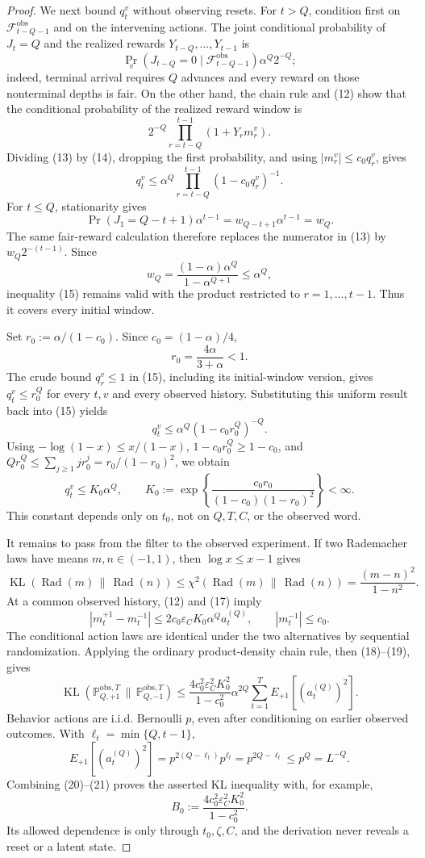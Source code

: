 \documentclass{article}
\begin{document}
\begin{proof}
We next bound \(q_t^v\) without observing resets.  For \(t>Q\), condition first on \(\mathcal F_{t-Q-1}^{\mathrm{obs}}\) and on the intervening actions.  The joint conditional probability of \(J_t=Q\) and the realized rewards \(Y_{t-Q},\ldots,Y_{t-1}\) is
\[
 \Pr_v(J_{t-Q}=0\mid\mathcal F_{t-Q-1}^{\mathrm{obs}})\alpha^Q2^{-Q}; \tag{13}
\]
indeed, terminal arrival requires \(Q\) advances and every reward on those nonterminal depths is fair.  On the other hand, the chain rule and (12) show that the conditional probability of the realized reward window is
\[
 2^{-Q}\prod_{r=t-Q}^{t-1}(1+Y_rm_r^v). \tag{14}
\]
Dividing (13) by (14), dropping the first probability, and using
\(|m_r^v|\le c_0q_r^v\), gives
\[
 q_t^v\le\alpha^Q\prod_{r=t-Q}^{t-1}(1-c_0q_r^v)^{-1}. \tag{15}
\]
For \(t\le Q\), stationarity gives
\[
 \Pr(J_1=Q-t+1)\alpha^{t-1}=w_{Q-t+1}\alpha^{t-1}=w_Q.
\]
The same fair-reward calculation therefore replaces the numerator in (13) by \(w_Q2^{-(t-1)}\).  Since
\[
 w_Q=\frac{(1-\alpha)\alpha^Q}{1-\alpha^{Q+1}}\le\alpha^Q,
\]
inequality (15) remains valid with the product restricted to \(r=1,\ldots,t-1\).  Thus it covers every initial window.

Set \(r_0:=\alpha/(1-c_0)\).  Since \(c_0=(1-\alpha)/4\),
\[
 r_0=\frac{4\alpha}{3+\alpha}<1. \tag{16}
\]
The crude bound \(q_r^v\le1\) in (15), including its initial-window version, gives \(q_t^v\le r_0^Q\) for every \(t,v\) and every observed history.  Substituting this uniform result back into (15) yields
\[
 q_t^v\le\alpha^Q(1-c_0r_0^Q)^{-Q}.
\]
Using \(-\log(1-x)\le x/(1-x)\), \(1-c_0r_0^Q\ge1-c_0\), and
\(Qr_0^Q\le\sum_{j\ge1}jr_0^j=r_0/(1-r_0)^2\), we obtain
\[
 q_t^v\le K_0\alpha^Q,
 \qquad
 K_0:=\exp\!\left\{\frac{c_0r_0}{(1-c_0)(1-r_0)^2}\right\}<\infty. \tag{17}
\]
This constant depends only on \(t_0\), not on \(Q,T,C\), or the observed word.

It remains to pass from the filter to the observed experiment.  If two Rademacher laws have means \(m,n\in(-1,1)\), then \(\log x\le x-1\) gives
\[
 \operatorname{KL}(\operatorname{Rad}(m)\,\|\,\operatorname{Rad}(n))
 \le\chi^2(\operatorname{Rad}(m)\,\|\,\operatorname{Rad}(n))
 =\frac{(m-n)^2}{1-n^2}. \tag{18}
\]
At a common observed history, (12) and (17) imply
\[
 |m_t^{+1}-m_t^{-1}|
 \le2c_0\varepsilon_CK_0\alpha^Qa_t^{(Q)},
 \qquad |m_t^{-1}|\le c_0. \tag{19}
\]
The conditional action laws are identical under the two alternatives by sequential randomization.  Applying the ordinary product-density chain rule, then (18)--(19), gives
\[
 \operatorname{KL}(\mathbb P_{Q,+1}^{\mathrm{obs},T}\,\|\,
                    \mathbb P_{Q,-1}^{\mathrm{obs},T})
 \le \frac{4c_0^2\varepsilon_C^2K_0^2}{1-c_0^2}
       \alpha^{2Q}\sum_{t=1}^TE_{+1}[(a_t^{(Q)})^2]. \tag{20}
\]
Behavior actions are i.i.d. Bernoulli \(p\), even after conditioning on earlier observed outcomes.  With \(\ell_t=\min\{Q,t-1\}\),
\[
 E_{+1}[(a_t^{(Q)})^2]
 =p^{2(Q-\ell_t)}p^{\ell_t}=p^{2Q-\ell_t}\le p^Q=L^{-Q}. \tag{21}
\]
Combining (20)--(21) proves the asserted KL inequality with, for example,
\[
 B_0:=\frac{4c_0^2\varepsilon_C^2K_0^2}{1-c_0^2}.
\]
Its allowed dependence is only through \(t_0,\zeta,C\), and the derivation never reveals a reset or a latent state.
\end{proof}
\end{document}
